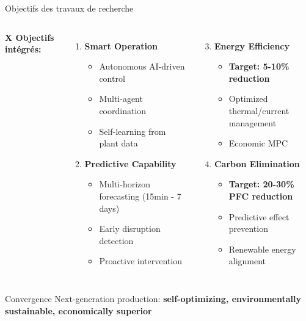 \documentclass[aspectratio=169]{beamer}
\begin{document}
\begin{frame}{Objectifs des travaux de recherche}


\begin{columns}[t]
\textbf{X Objectifs intégrés:}

\vspace{0.2cm}
\begin{enumerate}
    \item \textcolor{primary}{\textbf{Smart Operation}}
    \begin{itemize}
        \scriptsize
        \item Autonomous AI-driven control
        \item Multi-agent coordination
        \item Self-learning from plant data
    \end{itemize}
    
    \vspace{0.1cm}
    \item \textcolor{accent1}{\textbf{Predictive Capability}}
    \begin{itemize}
        \scriptsize
        \item Multi-horizon forecasting (15min - 7 days)
        \item Early disruption detection
        \item Proactive intervention
    \end{itemize}
\end{enumerate}

\vspace{0.85cm}
\begin{enumerate}
    \setcounter{enumi}{2}
    \item \textcolor{secondary}{\textbf{Energy Efficiency}}
    \begin{itemize}
        \scriptsize
        \item \textbf{Target: 5-10\% reduction}
        \item Optimized thermal/current management
        \item Economic MPC
    \end{itemize}
    
    \vspace{0.1cm}
    \item \textcolor{accent2}{\textbf{Carbon Elimination}}
    \begin{itemize}
        \scriptsize
        \item \textbf{Target: 20-30\% PFC reduction}
        \item Predictive effect prevention
        \item Renewable energy alignment
    \end{itemize}
\end{enumerate}
\end{columns}

\vspace{0.3cm}
\begin{alertblock}{Convergence}
Next-generation production: \textbf{self-optimizing, environmentally sustainable, economically superior}
\end{alertblock}
\end{frame}
\end{document}
